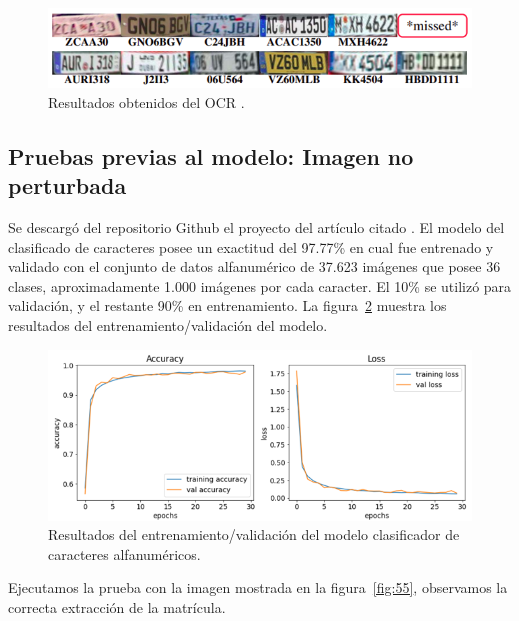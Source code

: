 \begin{enumerate}
         \begin{figure}[!h]
        \centering
        \includegraphics[scale = 0.85]{Figures/figura_54.PNG}
        \decoRule
        \caption[Resultados obtenidos del OCR]{ Resultados obtenidos del OCR \parencite{r60}.}
        \label{fig:54}
        \end{figure}
        
\end{enumerate}

\subsection{Pruebas previas al modelo: Imagen no perturbada}
Se descargó del repositorio Github el proyecto del artículo citado \parencite{r60}. El modelo del clasificado de caracteres posee un exactitud del 97.77\% en cual fue entrenado y validado con el conjunto de datos alfanumérico de 37.623 imágenes que posee 36 clases, aproximadamente 1.000 imágenes por cada caracter. El 10\% se utilizó para validación, y el restante 90\% en entrenamiento. La figura~\ref{fig:58} muestra los resultados del entrenamiento/validación del modelo.

 \begin{figure}[!h]
    \centering
    \includegraphics[scale = 0.85]{Figures/figura_58.PNG}
    \decoRule
    \caption[Resultados del entrenamiento/validación del clasificador de caracteres]{Resultados del entrenamiento/validación del modelo clasificador de caracteres alfanuméricos.}
    \label{fig:58}
\end{figure}



Ejecutamos la prueba con la imagen mostrada en la figura~\ref{fig:55}, observamos la correcta extracción de la matrícula.

